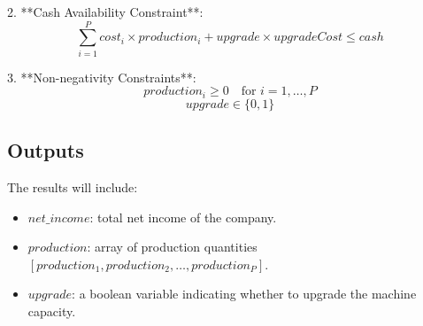 \documentclass{article}
\begin{document}
2. **Cash Availability Constraint**:
\[
\sum_{i=1}^{P} cost_i \times production_i + upgrade \times upgradeCost \leq cash
\]

3. **Non-negativity Constraints**:
\[
production_i \geq 0 \quad \text{for } i=1, \ldots, P
\]
\[
upgrade \in \{0, 1\}
\]

\subsection*{Outputs}
The results will include:
\begin{itemize}
    \item \( net\_income \): total net income of the company.
    \item \( production \): array of production quantities \( [production_1, production_2, \ldots, production_P] \).
    \item \( upgrade \): a boolean variable indicating whether to upgrade the machine capacity.
\end{itemize}
\end{document}
